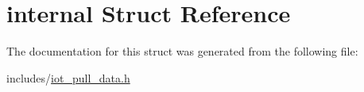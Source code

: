 \hypertarget{structinternal}{\section{internal Struct Reference}
\label{structinternal}
}


The documentation for this struct was generated from the following file\-:\begin{DoxyCompactItemize}
\item 
includes/\hyperlink{iot__pull__data_8h}{iot\-\_\-pull\-\_\-data.\-h}\end{DoxyCompactItemize}
